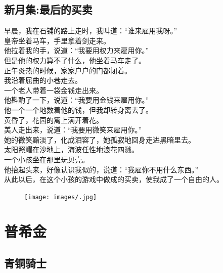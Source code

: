 \documentclass[]{book}
\renewenvironment{quote}{\begin{VF}}{\end{VF}}
\begin{document}
\section{新月集:最后的买卖}

\begin{quote}
早晨，我在石铺的路上走时，我叫道：``谁来雇用我呀。''\\
皇帝坐着马车，手里拿着剑走来。\\
他拉着我的手，说道：``我要用权力来雇用你。''\\
但是他的权力算不了什么，他坐着马车走了。\\
正午炎热的时候，家家户户的门都闭着。\\
我沿着屈曲的小巷走去。\\
一个老人带着一袋金钱走出来。\\
他斟酌了一下，说道：``我要用金钱来雇用你。''\\
他一个一个地数着他的钱，但我却转身离去了。\\
黄昏了，花园的篱上满开着花。\\
美人走出来，说道：``我要用微笑来雇用你。''\\
她的微笑黯淡了，化成泪容了，她孤寂地回身走进黑暗里去。\\
太阳照耀在沙地上，海波任性地浪花四溅。\\
一个小孩坐在那里玩贝壳。\\
他抬起头来，好像认识我似的，说道：``我雇你不用什么东西。''\\
从此以后，在这个小孩的游戏中做成的买卖，使我成了一个自由的人。
\end{quote}

\begin{figure}[htbp]
\centering
\texttt{[image: images/.jpg]}
\caption{}
\end{figure}

\chapter{普希金}

\section{青铜骑士}
\end{document}
